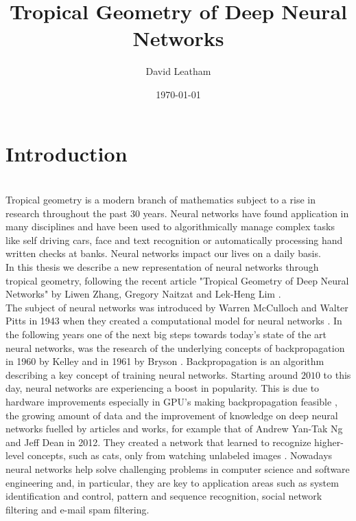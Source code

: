 \documentclass{article}
\title{Tropical Geometry of Deep Neural Networks}
\author{David Leatham}
\date{\today}
\theoremstyle{definition}
\begin{document}


\newpage
  
\tableofcontents

\newpage


\section{Introduction} 
\leavevmode
\\
Tropical geometry is a modern branch of mathematics subject to a rise in research throughout the past 30 years. Neural networks have found application in many disciplines and have been used to algorithmically manage complex tasks like self driving cars, face and text recognition or automatically processing hand written checks at banks. Neural networks impact our lives on a daily basis. \\
In this thesis we describe a new representation of neural networks through tropical geometry, following the recent article "Tropical Geometry of Deep Neural Networks" by Liwen Zhang, Gregory Naitzat and Lek-Heng Lim \cite{maclagan2015introduction}. \\

The subject of neural networks was introduced by Warren McCulloch and Walter Pitts in 1943 when they created a computational model for neural networks \cite{mcculloch1943logical}. In the following years one of the next big steps towards today's state of the art neural networks, was the research of the underlying concepts of backpropagation in 1960 by Kelley \cite{kelley1960gradient} and in 1961 by Bryson \cite{bryson1961gradient}. Backpropagation is an algorithm describing a key concept of training neural networks. Starting around $2010$ to this day, neural networks are experiencing a boost in popularity. This is due to hardware improvements especially in GPU's making backpropagation feasible \cite{cirecsan2010deep}, the growing amount of data and the improvement of knowledge on deep neural networks fuelled by articles and works, for example that of Andrew Yan-Tak Ng and Jeff Dean in 2012. They created a network that learned to recognize higher-level concepts, such as cats, only from watching unlabeled images \cite{DBLP:journals/corr/abs-1112-6209}. Nowadays neural networks help solve challenging problems in computer science and software engineering and, in particular, they are key to application areas such as system identification and control, pattern and sequence recognition, social network filtering and e-mail spam filtering. \\
\end{document}
